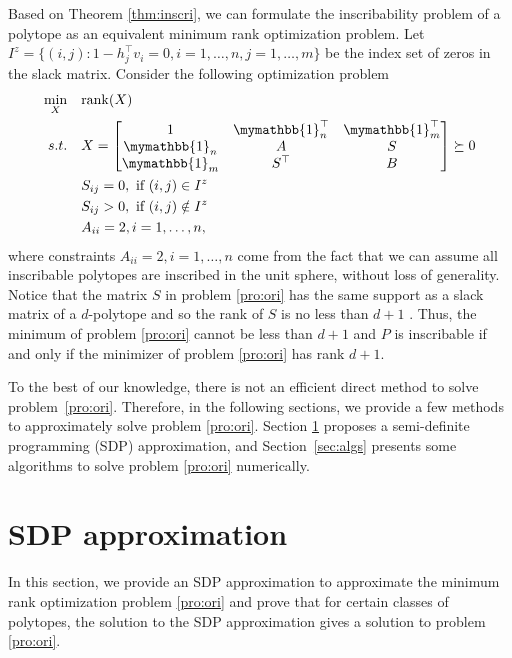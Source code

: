\documentclass[smallextended, envcountsame]{svjour3}
\begin{document}
    Based on Theorem \ref{thm:inscri}, we can formulate the inscribability problem of a polytope as an equivalent minimum rank optimization problem.  Let $I^z=\{(i,j):1-h_j^\top v_i=0,i=1,\ldots,n,j=1,\ldots,m\}$ be the index set of zeros in the slack matrix.  Consider the following optimization problem
    \begin{align}\label{pro:ori}
        \begin{split}
            \min_X~~~&\mathrm{rank}(X)\\
            s.t.~~~& X = 
            \begin{bmatrix}
                1 & \mymathbb{1}_n^\top & \mymathbb{1}_m^\top\\
                \mymathbb{1}_n & A & S\\
                \mymathbb{1}_m & S^\top & B
            \end{bmatrix} \succeq 0\\
            & S_{ij} = 0,~\text{if}~(i,j)\in I^z\\
            & S_{ij} > 0,~\text{if}~(i,j)\notin I^z\\
            & A_{ii} = 2, i = 1,\ldots,n,
        \end{split}
    \end{align}
    where constraints $A_{ii} = 2, i = 1,\ldots,n$ come from the fact that we can assume all inscribable polytopes are inscribed in the unit sphere, without loss of generality.  Notice that the matrix $S$ in problem \eqref{pro:ori} has the same support as a slack matrix of a $d$-polytope and so the rank of $S$ is no less than $d+1$ \cite[Lemma 3.1]{gouveia2019slack}.  Thus, the minimum of problem \eqref{pro:ori} cannot be less than $d+1$ and $P$ is inscribable if and only if the minimizer of problem \eqref{pro:ori} has rank $d+1$.

    To the best of our knowledge, there is not an efficient direct method to solve problem~\eqref{pro:ori}.  Therefore, in the following sections, we provide a few methods to approximately solve problem \eqref{pro:ori}. Section \ref{sec:sdp} proposes a semi-definite programming (SDP) approximation, and Section~\ref{sec:algs} presents some algorithms to solve problem \eqref{pro:ori} numerically. 

    

\section{SDP approximation}\label{sec:sdp}
    In this section, we provide an SDP approximation to approximate the minimum rank optimization problem \eqref{pro:ori} and prove that for certain classes of polytopes, the solution to the SDP approximation gives a solution to problem \eqref{pro:ori}.
\end{document}
